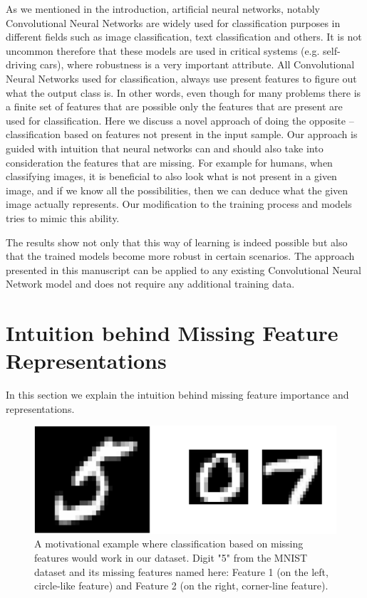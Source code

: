\documentclass[b5paper]{book}
\begin{document}
As we mentioned in the introduction, artificial neural networks, notably Convolutional Neural Networks are widely used for classification purposes in different fields such as image classification, text classification and others. It is not uncommon therefore that these models are used in critical systems (e.g. self-driving cars), where robustness is a very important attribute. All Convolutional Neural Networks used for classification, always use present features to figure out what the output class is. In other words, even though for many problems there is a finite set of features that are possible only the features that are present are used for classification. Here we discuss a novel approach of doing the opposite -- classification based on features not present in the input sample. Our approach is guided with intuition that neural networks can and should also take into consideration the features that are missing. For example for humans, when classifying images, it is beneficial to also look what is not present in a given image, and if we know all the possibilities, then we can deduce what the given image actually represents. Our modification to the training process and models tries to mimic this ability.

The results show not only that this way of learning is indeed possible but also that the trained models become more robust in certain scenarios. The approach presented in this manuscript can be applied to any existing Convolutional Neural Network model and does not require any additional training data. 

\section{Intuition behind Missing Feature Representations}

In this section we explain the intuition behind missing feature importance and representations.

\begin{figure}[!ht]
  \centering
  \includegraphics[scale=0.5, trim=0pt 0pt 0pt 0pt, clip]{motivation} 
  \caption{A motivational example where classification based on missing features would work in our dataset. Digit "5" from the MNIST dataset and its missing features named here: Feature 1 (on the left, circle-like feature) and Feature 2 (on the right, corner-line feature).}
  \label{fig:sample-motivation}
\end{figure}
\end{document}
